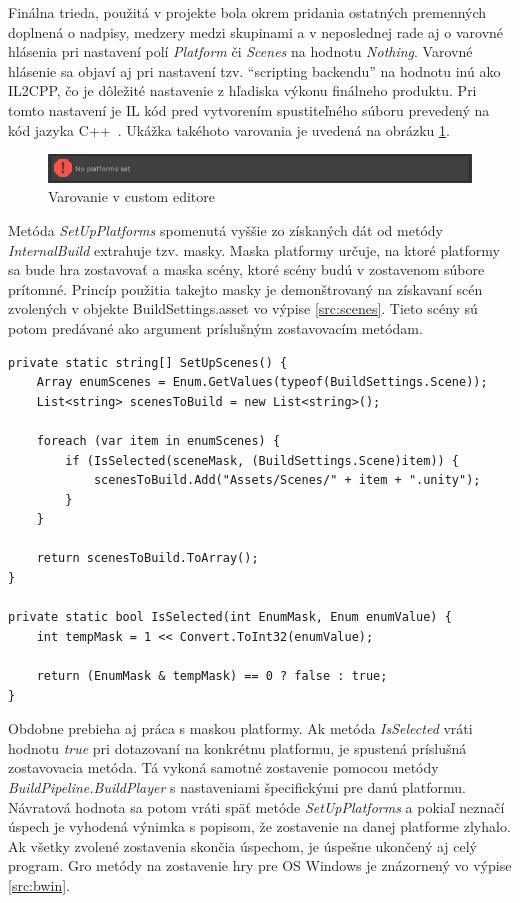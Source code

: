 \documentclass[slovak, bachelorpractice]{diploma}
\begin{document}
Finálna trieda, použitá v projekte bola okrem pridania ostatných premenných doplnená o nadpisy, medzery medzi skupinami a v neposlednej rade aj o varovné hlásenia pri nastavení polí \textit{Platform} či \textit{Scenes} na hodnotu \textit{Nothing}. Varovné hlásenie sa objaví aj pri nastavení tzv. \enquote{scripting backendu} na hodnotu inú ako IL2CPP, čo je dôležité nastavenie z hľadiska výkonu finálneho produktu. Pri tomto nastavení je IL kód pred vytvorením spustiteľného súboru prevedený na kód jazyka \mbox{C++ \cite{IL2CPP}}. Ukážka takéhoto varovania je uvedená na obrázku \ref{pic:Warr}.

\begin{figure}[!htbp]
	\centering
	\includegraphics[width=1\textwidth]{Pictures/warr.png}
	\caption{Varovanie v custom editore}
	\label{pic:Warr}
\end{figure}

Metóda \textit{SetUpPlatforms} spomenutá vyššie zo získaných dát od metódy \textit{InternalBuild} extrahuje tzv. masky. Maska platformy určuje, na ktoré platformy sa bude hra zostavovať a maska scény, ktoré scény budú v zostavenom súbore prítomné. Princíp použitia takejto masky je demonštrovaný na získavaní scén zvolených v objekte BuildSettings.asset vo výpise \ref{src:scenes}. Tieto scény sú potom predávané ako argument príslušným zostavovacím metódam. 

\vspace{10pt}
\begin{lstlisting}[label=src:scenes,caption={Extrahovanie zvolených scén pomocou masky}]
private static string[] SetUpScenes() {
    Array enumScenes = Enum.GetValues(typeof(BuildSettings.Scene));
    List<string> scenesToBuild = new List<string>();

    foreach (var item in enumScenes) {
        if (IsSelected(sceneMask, (BuildSettings.Scene)item)) {
            scenesToBuild.Add("Assets/Scenes/" + item + ".unity");
        }
    }

    return scenesToBuild.ToArray();
}

private static bool IsSelected(int EnumMask, Enum enumValue) {
    int tempMask = 1 << Convert.ToInt32(enumValue);
    
    return (EnumMask & tempMask) == 0 ? false : true;
}
\end{lstlisting}

Obdobne prebieha aj práca s maskou platformy. Ak metóda \textit{IsSelected} vráti hodnotu \textit{true} pri dotazovaní na konkrétnu platformu, je spustená príslušná zostavovacia metóda. Tá vykoná samotné zostavenie pomocou metódy \textit{BuildPipeline.BuildPlayer} s nastaveniami špecifickými pre danú platformu. Návratová hodnota sa potom vráti späť metóde \textit{SetUpPlatforms} a pokiaľ neznačí úspech je vyhodená výnimka s popisom, že zostavenie na danej platforme zlyhalo. Ak všetky zvolené zostavenia skončia úspechom, je úspešne ukončený aj celý program. Gro  metódy na zostavenie hry pre OS Windows je znázornený vo výpise \ref{src:bwin}. 
\end{document}
